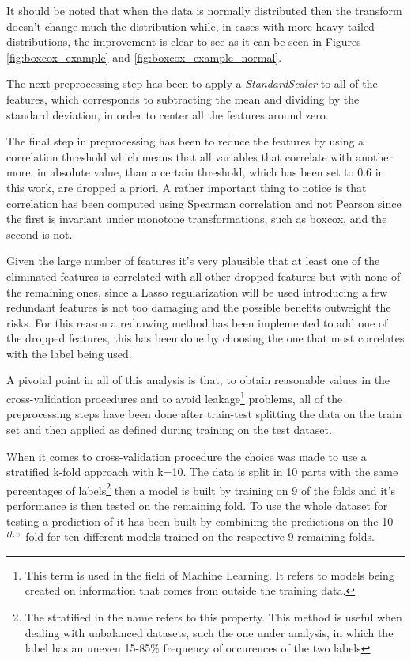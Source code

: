  It should be noted that when the data is normally distributed then the transform doesn't change much the distribution while, in cases with more heavy tailed distributions, the improvement is clear to see as it can be seen in Figures \ref{fig:boxcox_example} and \ref{fig:boxcox_example_normal}.

The next preprocessing step has been to apply a \textit{StandardScaler} to all of the features, which corresponds to subtracting the mean and dividing by the standard deviation, in order to center all the features around zero. 

The final step in preprocessing has been to reduce the features by using a correlation threshold which means that all variables that correlate with another more, in absolute value, than a certain threshold, which has been set to 0.6 in this work, are dropped a priori. A rather important thing to notice is that correlation has been computed using Spearman correlation and not Pearson since the first is invariant under monotone transformations, such as boxcox, and the second is not.

Given the large number of features it's very plausible that at least one of the eliminated features is correlated with all other dropped features but with none of the remaining ones, since a Lasso regularization will be used introducing a few redundant features is not too damaging and the possible benefits outweight the risks. For this reason a redrawing method has been implemented to add one of the dropped features, this has been done by choosing the one that most correlates with the label being used.

A pivotal point in all of this analysis is that, to obtain reasonable values in the cross-validation procedures and to avoid leakage\footnote{This term is used in the field of Machine Learning. It refers to models being created on information that comes from outside the training data.} problems, all of the preprocessing steps have been done after train-test splitting the data on the train set and then applied as defined during training on the test dataset.

When it comes to cross-validation procedure the choice was made to use a stratified k-fold approach with k=10. The data is split in 10 parts with the same percentages of labels\footnote{The stratified in the name refers to this property. This method is useful when dealing with unbalanced datasets, such the one under analysis, in which the label has an uneven 15-85$\%$ frequency of occurences of the two labels} then a model is built by training on 9 of the folds and it's performance is then tested on the remaining fold. To use the whole dataset for testing a prediction of it has been built by combinimg the predictions on the 10$^{th}"$ fold for ten different models trained on the respective 9 remaining folds.

